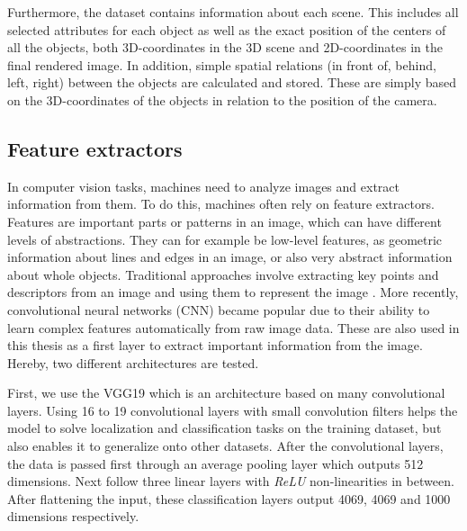 Furthermore, the dataset contains information about each scene.
This includes all selected attributes for each object as well as the exact position of the centers of all the objects, both 3D-coordinates in the 3D scene and 2D-coordinates in the final rendered image.
In addition, simple spatial relations (in front of, behind, left, right) between the objects are calculated and stored.
These are simply based on the 3D-coordinates of the objects in relation to the position of the camera.

\subsection{Feature extractors}
\label{sec:feature-extractors}
In computer vision tasks, machines need to analyze images and extract information from them.
To do this, machines often rely on feature extractors.
Features are important parts or patterns in an image, which can have different levels of abstractions.
They can for example be low-level features, as geometric information about lines and edges in an image, or also very abstract information about whole objects.
Traditional approaches involve extracting key points and descriptors from an image and using them to represent the image \citep{Harris1988,Lowe1999,Bay2006}.
More recently, convolutional neural networks (CNN) became popular due to their ability to learn complex features automatically from raw image data.
These are also used in this thesis as a first layer to extract important information from the image. Hereby, two different architectures are tested.

First, we use the VGG19 \citep{Simonyan2015} which is an architecture based on many convolutional layers.
Using 16 to 19 convolutional layers with small convolution filters helps the model to solve localization and classification tasks on the training dataset, but also enables it to generalize onto other datasets.
After the convolutional layers, the data is passed first through an average pooling layer which outputs 512 dimensions.
Next follow three linear layers with \emph{ReLU} non-linearities in between.
After flattening the input, these classification layers output 4069, 4069 and 1000 dimensions respectively.

